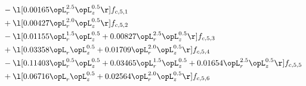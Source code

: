 \begin{alignat}{2}
& - \l[  0.00165 \opL_r^{2.5} \opL_z^{0.5}  \r] f_{c,5,1} \nonumber \\ 
& + \l[  0.00427 \opL_r^{2.0} \opL_z^{0.5}  \r] f_{c,5,2} \nonumber \\ 
& - \l[  0.01155 \opL_r^{1.5} \opL_z^{0.5} +  0.00827 \opL_r^{2.5} \opL_z^{0.5}  \r] f_{c,5,3} \nonumber \\ 
& + \l[  0.03358 \opL_r \opL_z^{0.5} +  0.01709 \opL_r^{2.0} \opL_z^{0.5}  \r] f_{c,5,4} \nonumber \\ 
& - \l[  0.11403 \opL_r^{0.5} \opL_z^{0.5} +  0.03465 \opL_r^{1.5} \opL_z^{0.5} +  0.01654 \opL_r^{2.5} \opL_z^{0.5}  \r] f_{c,5,5} \nonumber \\ 
& + \l[  0.06716 \opL_r \opL_z^{0.5} +  0.02564 \opL_r^{2.0} \opL_z^{0.5}  \r] f_{c,5,6} \nonumber \\ 
\end{alignat} 


